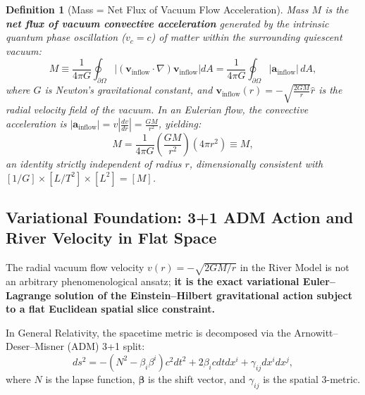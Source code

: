 \documentclass[11pt,a4paper]{article}
\newtheorem{definition}{Definition}[section]
\begin{document}
\begin{definition}[Mass = Net Flux of Vacuum Flow Acceleration]
    \label{def:kutle_tanim_p1}
    Mass $M$ is the \textbf{net flux of vacuum convective acceleration} generated by the intrinsic quantum phase oscillation ($v_c = c$) of matter within the surrounding quiescent vacuum:
    \begin{equation}
        M \equiv \frac{1}{4\pi G} \oint_{\partial \Omega} \left| (\mathbf{v}_{\mathrm{inflow}} \cdot \nabla) \mathbf{v}_{\mathrm{inflow}} \right| dA = \frac{1}{4\pi G} \oint_{\partial \Omega} |\mathbf{a}_{\mathrm{inflow}}| \, dA,
        \label{eq:kutle_akisi}
    \end{equation}
    where $G$ is Newton's gravitational constant, and $\mathbf{v}_{\mathrm{inflow}}(r) = -\sqrt{\frac{2GM}{r}}\hat{r}$ is the radial velocity field of the vacuum. In an Eulerian flow, the convective acceleration is $|\mathbf{a}_{\mathrm{inflow}}| = v \left|\frac{dv}{dr}\right| = \frac{GM}{r^2}$, yielding:
    \begin{equation}
        M = \frac{1}{4\pi G} \left( \frac{GM}{r^2} \right) (4\pi r^2) \equiv M,
    \end{equation}
    an identity strictly independent of radius $r$, dimensionally consistent with $[1/G] \times [L/T^2] \times [L^2] = [M]$.
\end{definition}

\subsection{Variational Foundation: 3+1 ADM Action and River Velocity in Flat Space}
\label{sec:adm_eylem_p1}

The radial vacuum flow velocity $v(r) = -\sqrt{2GM/r}$ in the River Model is not an arbitrary phenomenological ansatz; \textbf{it is the exact variational Euler--Lagrange solution of the Einstein--Hilbert gravitational action subject to a flat Euclidean spatial slice constraint.}

In General Relativity, the spacetime metric is decomposed via the Arnowitt--Deser--Misner (ADM) 3+1 split:
\begin{equation}
    ds^2 = -\left(N^2 - \beta_i \beta^i\right) c^2 dt^2 + 2 \beta_i c dt dx^i + \gamma_{ij} dx^i dx^j,
    \label{eq:adm_metrik_p1}
\end{equation}
where $N$ is the lapse function, $\boldsymbol{\beta}$ is the shift vector, and $\gamma_{ij}$ is the spatial 3-metric.
\end{document}
